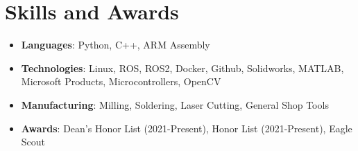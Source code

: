 \documentclass[letterpaper,10pt]{article}
\makeatletter
\newcommand{\resumeItem}[2]{
  \item\small{
    \textbf{#1}{: #2 \vspace{-2pt}}
  }
}
\newcommand{\resumeSubheading}[4]{
  \vspace{-1pt}\item
    \begin{tabular*}{0.97\textwidth}{l@{\extracolsep{\fill}}r}
      \textbf{#1} & \textbf{#2} \\
      \textit{#3} & \textit{#4} \\
    \end{tabular*}\vspace{-5pt}
}
\newcommand{\resumeSubItem}[2]{\resumeItem{#1}{#2}\vspace{-3pt}}
\newcommand{\resumeSubHeadingListStart}{\begin{itemize}[leftmargin=*]}
\newcommand{\resumeSubHeadingListEnd}{\end{itemize}}
\makeatother
\begin{document}
\section{Skills and Awards}
	\resumeSubHeadingListStart
        \resumeSubItem{Languages}{Python, C++, ARM Assembly} %
        \resumeSubItem{Technologies}{Linux, ROS, ROS2, Docker, Github, Solidworks, MATLAB, Microsoft Products, Microcontrollers, OpenCV} %
        \resumeSubItem{Manufacturing}{Milling, Soldering, Laser Cutting, General Shop Tools}
        \resumeSubItem{Awards}{Dean's Honor List (2021-Present), Honor List (2021-Present), Eagle Scout}
    \resumeSubHeadingListEnd
\vspace{-5pt}


\end{document}
